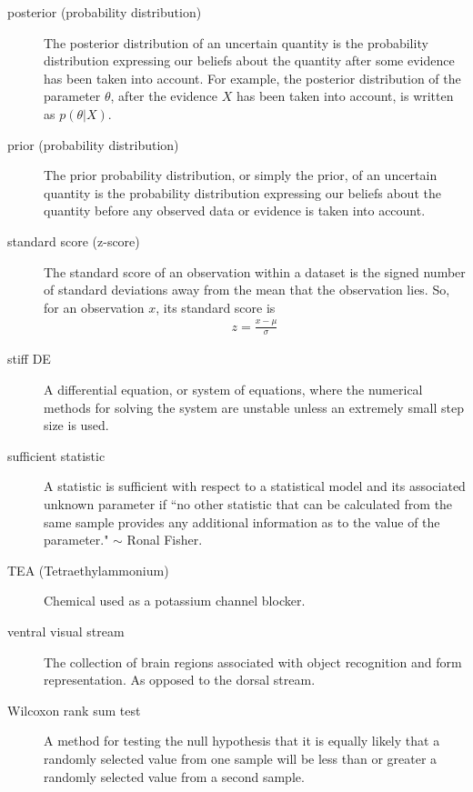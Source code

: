 \documentclass[a4paper,12pt]{article}
\theoremstyle{definition}
\begin{document}
\begin{description}
  \item[posterior (probability distribution)] The posterior distribution of an uncertain quantity is the probability distribution expressing our beliefs about the quantity after some evidence has been taken into account. For example, the posterior distribution of the parameter $\theta$, after the evidence $X$ has been taken into account, is written as $p(\theta|X)$.

  \item[prior (probability distribution)] The prior probability distribution, or simply the prior, of an uncertain quantity is the probability distribution expressing our beliefs about the quantity before any observed data or evidence is taken into account.

  \item[standard score (z-score)] The standard score of an observation within a dataset is the signed number of standard deviations away from the mean that the observation lies. So, for an observation $x$, its standard score is
  	\begin{align}
  	z = \frac{x - \mu}{\sigma}
  	\end{align}

  \item[stiff DE] A differential equation, or system of equations, where the numerical methods for solving the system are unstable unless an extremely small step size is used.

  \item[sufficient statistic] A statistic is sufficient with respect to a statistical model and its associated unknown parameter if ``no other statistic that can be calculated from the same sample provides any additional information as to the value of the parameter." $\sim$ Ronal Fisher.

  \item[TEA (Tetraethylammonium)] Chemical used as a potassium channel blocker.

  \item[ventral visual stream] The collection of brain regions associated with object recognition and form representation. As opposed to the dorsal stream.

  \item[Wilcoxon rank sum test] A method for testing the null hypothesis that it is equally likely that a randomly selected value from one sample will be less than or greater a randomly selected value from a second sample.

 \end{description}
\end{document}
